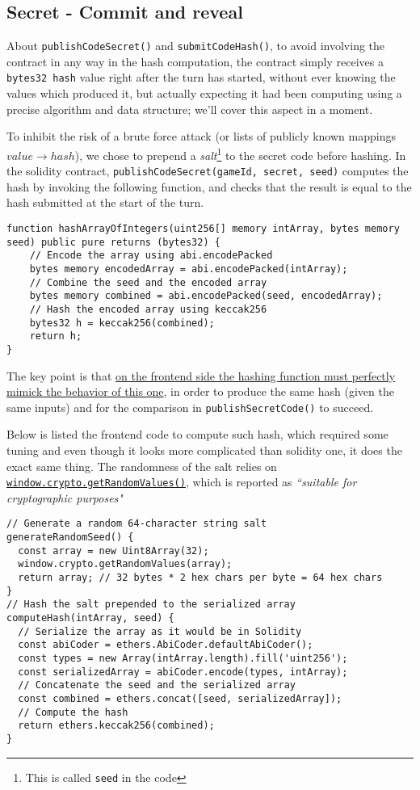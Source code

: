\subsection{Secret - Commit and reveal}
\label{sec:secret_hash}
About \texttt{publishCodeSecret()} and \texttt{submitCodeHash()}, to avoid involving the contract in any way in the hash computation, the contract simply receives a \lstinline{bytes32 hash} value right after the turn has started, without ever knowing the values which produced it, but actually expecting it had been computing using a precise algorithm and data structure; we'll cover this aspect in a moment.  

To inhibit the risk of a brute force attack (or lists of publicly known mappings $value\rightarrow hash$), we chose to prepend a \textit{salt}\footnote{This is called \lstinline{seed} in the code} to the secret code before hashing. 
In the solidity contract, \texttt{publishCodeSecret(gameId, secret, seed)} computes the hash by invoking the following function, and checks that the result is equal to the hash submitted at the start of the turn.
\begin{lstlisting}
function hashArrayOfIntegers(uint256[] memory intArray, bytes memory seed) public pure returns (bytes32) {
    // Encode the array using abi.encodePacked
    bytes memory encodedArray = abi.encodePacked(intArray);
    // Combine the seed and the encoded array
    bytes memory combined = abi.encodePacked(seed, encodedArray);
    // Hash the encoded array using keccak256
    bytes32 h = keccak256(combined);
    return h;
}
\end{lstlisting}

The key point is that \ul{on the frontend side the hashing function must perfectly mimick the behavior of this one}, in order to produce the same hash (given the same inputs) and for the comparison in \texttt{publishSecretCode()} to succeed.

Below is listed the frontend code to compute such hash, which required some tuning and even though it looks more complicated than solidity one, it does the exact same thing.
The randomness of the salt relies on\\ \href{https://developer.mozilla.org/en-US/docs/Web/API/Crypto/getRandomValues}{\texttt{window.crypto.getRandomValues()}}, which is reported as \textit{``suitable for cryptographic purposes"}
\begin{lstlisting}
// Generate a random 64-character string salt
generateRandomSeed() {
  const array = new Uint8Array(32);
  window.crypto.getRandomValues(array);
  return array; // 32 bytes * 2 hex chars per byte = 64 hex chars
}
// Hash the salt prepended to the serialized array
computeHash(intArray, seed) {
  // Serialize the array as it would be in Solidity
  const abiCoder = ethers.AbiCoder.defaultAbiCoder();
  const types = new Array(intArray.length).fill('uint256');
  const serializedArray = abiCoder.encode(types, intArray);
  // Concatenate the seed and the serialized array
  const combined = ethers.concat([seed, serializedArray]);
  // Compute the hash
  return ethers.keccak256(combined);
}
\end{lstlisting}

